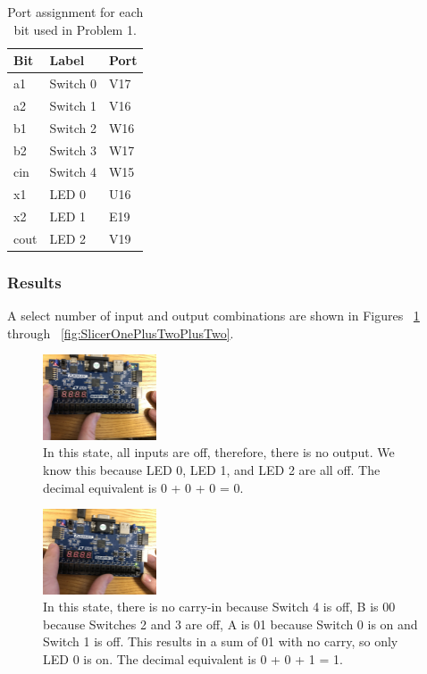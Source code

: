 \documentclass[11pt]{article}
\begin{document}
\begin{table}[H]
\begin{center}
	\begin{tabular}{| l | l | l |}
		\hline
		Bit & Label & Port \\ \hline
		a1 & Switch 0 & V17 \\ \hline
		a2 & Switch 1 & V16 \\ \hline
		b1 & Switch 2 & W16 \\ \hline
		b2 & Switch 3 & W17 \\ \hline
		cin & Switch 4 & W15 \\ \hline
		x1 & LED 0 & U16 \\ \hline
		x2 & LED 1 & E19 \\ \hline
		cout & LED 2 & V19 \\ \hline
	\end{tabular}
	\caption{\label{tab:slicerPinAssignments}Port assignment for each bit used in Problem 1.}
\end{center}
\end{table}

\subsubsection{Results}
A select number of input and output combinations are shown in Figures ~\ref{fig:SlicerAllOff} through ~\ref{fig:SlicerOnePlusTwoPlusTwo}.

\begin{figure}[H]
\begin{center}
	\includegraphics[width=0.3\textwidth]{./report-images/Part1/IMG_3032.jpg}
	\caption{\label{fig:SlicerAllOff}In this state, all inputs are off, therefore, there is no output. We know this because LED 0, LED 1, and LED 2 are all off. The decimal equivalent is 0 + 0 + 0 = 0.}
\end{center}
\end{figure}

\begin{figure}[H]
\begin{center}
	\includegraphics[width=0.3\textwidth]{./report-images/Part1/IMG_3033.jpg}
	\caption{\label{fig:SlicerZeroPlusOne}In this state, there is no carry-in because Switch 4 is off, B is 00 because Switches 2 and 3 are off, A is 01 because Switch 0 is on and Switch 1 is off. This results in a sum of 01 with no carry, so only LED 0 is on. The decimal equivalent is 0 + 0 + 1 = 1.}
\end{center}
\end{figure}
\end{document}
